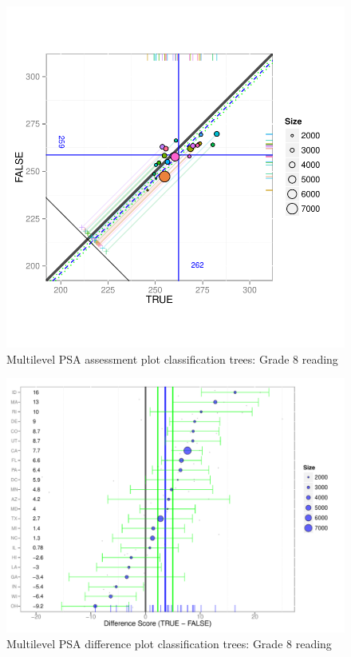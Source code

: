 \begin{figure}[h!]
\begin{center}
\includegraphics[width=\textwidth]{../Figures2009/g8read-mlpsa-ctree-circ.pdf}
\caption{Multilevel PSA assessment plot classification trees: Grade 8 reading}
\end{center}
\end{figure}

\begin{figure}[h!]
\begin{center}
\includegraphics[width=\textwidth]{../Figures2009/g8read-mlpsa-ctree-diff.pdf}
\caption{Multilevel PSA difference plot classification trees: Grade 8 reading}
\end{center}
\label{fig:g8read-mlpsa-ctree-diff}
\end{figure}



